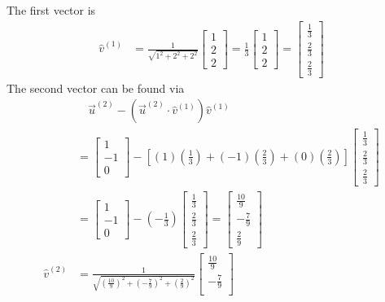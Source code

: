 \begin{solution}
The first vector is
\begin{align*}
\hat{v}^{(1)} &= \frac{1}{\sqrt{1^2+2^2+2^2}}
\begin{bmatrix}
1 \\
2 \\
2
\end{bmatrix} 
= 
\frac{1}{3}
\begin{bmatrix}
1 \\
2 \\
2
\end{bmatrix} 
=
\begin{bmatrix}
\frac{1}{3} \\
\frac{2}{3} \\
\frac{2}{3}
\end{bmatrix}
\end{align*}
The second vector can be found via
\begin{align*}
&\quad \vec{u}^{(2)} - (\vec{u}^{(2)} \cdot \hat{v}^{(1)})\hat{v}^{(1)} \\
&= 
\begin{bmatrix}
1 \\
-1 \\
0
\end{bmatrix} 
-
[(1)(\frac{1}{3}) + (-1)(\frac{2}{3}) + (0)(\frac{2}{3})]
\begin{bmatrix}
\frac{1}{3} \\
\frac{2}{3} \\
\frac{2}{3}
\end{bmatrix} \\
&= 
\begin{bmatrix}
1 \\
-1 \\
0
\end{bmatrix}
- (-\frac{1}{3})
\begin{bmatrix}
\frac{1}{3} \\
\frac{2}{3} \\
\frac{2}{3}
\end{bmatrix}
=
\begin{bmatrix}
\frac{10}{9} \\
-\frac{7}{9} \\
\frac{2}{9}
\end{bmatrix} \\
\hat{v}^{(2)} &= \frac{1}{\sqrt{(\frac{10}{9})^2+(-\frac{7}{9})^2+(\frac{2}{9})^2}}
\begin{bmatrix}
\frac{10}{9} \\
-\frac{7}{9} \\

\end{bmatrix}
\end{align*}
\end{solution}
